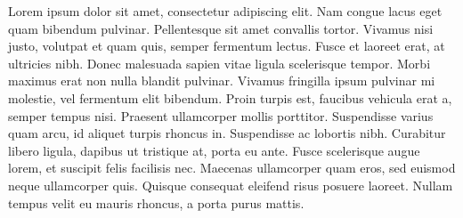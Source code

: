Lorem ipsum dolor sit amet, consectetur adipiscing elit. Nam congue lacus eget quam bibendum pulvinar. Pellentesque sit amet convallis tortor. Vivamus nisi justo, volutpat et quam quis, semper fermentum lectus. Fusce et laoreet erat, at ultricies nibh. Donec malesuada sapien vitae ligula scelerisque tempor. Morbi maximus erat non nulla blandit pulvinar. Vivamus fringilla ipsum pulvinar mi molestie, vel fermentum elit bibendum. Proin turpis est, faucibus vehicula erat a, semper tempus nisi. Praesent ullamcorper mollis porttitor. Suspendisse varius quam arcu, id aliquet turpis rhoncus in. Suspendisse ac lobortis nibh. Curabitur libero ligula, dapibus ut tristique at, porta eu ante. Fusce scelerisque augue lorem, et suscipit felis facilisis nec. Maecenas ullamcorper quam eros, sed euismod neque ullamcorper quis. Quisque consequat eleifend risus posuere laoreet. Nullam tempus velit eu mauris rhoncus, a porta purus mattis.
